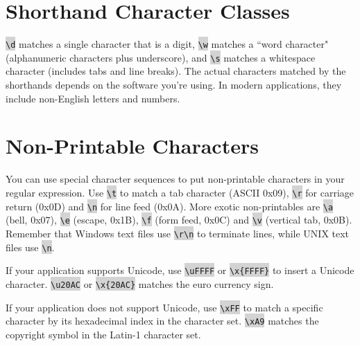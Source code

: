 
\chapter{Shorthand Character Classes}


\colorbox{lightgray}{\texttt{\textbackslash d}} matches a single character that is a digit, \colorbox{lightgray}{\texttt{\textbackslash w}} matches a ``word character" (alphanumeric characters plus underscore), and \colorbox{lightgray}{\texttt{\textbackslash s}} matches a whitespace character (includes tabs and line breaks). The actual characters matched by the shorthands depends on the software you're using. In modern applications, they include non-English letters and numbers.



\chapter{Non-Printable Characters}


You can use special character sequences to put non-printable characters in your regular expression. Use \colorbox{lightgray}{\texttt{\textbackslash t}} to match a tab character (ASCII 0x09), \colorbox{lightgray}{\texttt{\textbackslash r}} for carriage return (0x0D) and \colorbox{lightgray}{\texttt{\textbackslash n}} for line feed (0x0A). More exotic non-printables are \colorbox{lightgray}{\texttt{\textbackslash a}} (bell, 0x07), \colorbox{lightgray}{\texttt{\textbackslash e}} (escape, 0x1B), \colorbox{lightgray}{\texttt{\textbackslash f}} (form feed, 0x0C) and \colorbox{lightgray}{\texttt{\textbackslash v}} (vertical tab, 0x0B). Remember that Windows text files use \colorbox{lightgray}{\texttt{\textbackslash r\textbackslash n}} to terminate lines, while UNIX text files use \colorbox{lightgray}{\texttt{\textbackslash n}}.


If your application supports Unicode, use \colorbox{lightgray}{\texttt{\textbackslash uFFFF}} or \colorbox{lightgray}{\texttt{\textbackslash x\{FFFF\}}} to insert a Unicode character. \colorbox{lightgray}{\texttt{\textbackslash u20AC}} or \colorbox{lightgray}{\texttt{\textbackslash x\{20AC\}}} matches the euro currency sign.


If your application does not support Unicode, use \colorbox{lightgray}{\texttt{\textbackslash xFF}} to match a specific character by its hexadecimal index in the character set. \colorbox{lightgray}{\texttt{\textbackslash xA9}} matches the copyright symbol in the Latin-1 character set.

